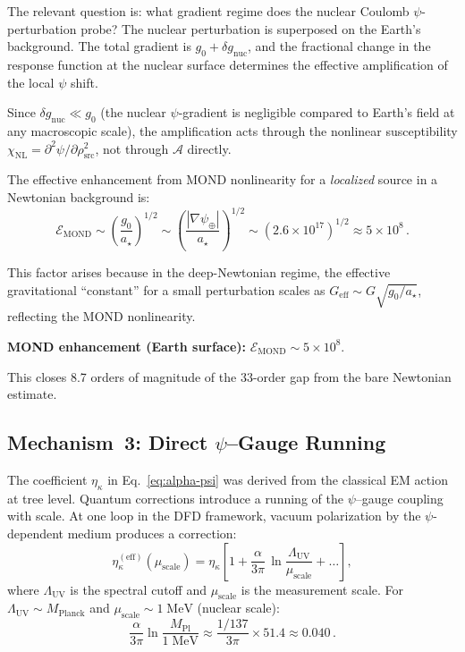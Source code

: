 \documentclass[aps,prd,twocolumn,superscriptaddress,nofootinbib]{revtex4-2}
\newcommand{\astar}{a_\star}
\newcommand{\ee}[1]{\times 10^{#1}}
\newcommand{\kap}{\kappa}
\begin{document}
The relevant question is: what gradient regime does the nuclear
Coulomb $\psi$-perturbation probe?  The nuclear perturbation is
superposed on the Earth's background.  The total gradient is
$g_0 + \delta g_{\mathrm{nuc}}$, and the fractional change in the
response function at the nuclear surface determines the effective
amplification of the local $\psi$ shift.

Since $\delta g_{\mathrm{nuc}} \ll g_0$ (the nuclear $\psi$-gradient
is negligible compared to Earth's field at any macroscopic scale),
the amplification acts through the nonlinear susceptibility
$\chi_{\mathrm{NL}} = \partial^2\psi/\partial\rho_{\mathrm{src}}^2$,
not through $\mathcal{A}$ directly.

The effective enhancement from MOND nonlinearity for a
\emph{localized} source in a Newtonian background is:
\begin{equation}\label{eq:mond-enhance}
\mathcal{E}_{\mathrm{MOND}} \sim
\left(\frac{g_0}{\astar}\right)^{1/2}
\sim \left(\frac{|\nabla\psi_\oplus|}{\astar}\right)^{1/2}
\sim (2.6\ee{17})^{1/2} \approx 5\ee{8}\,.
\end{equation}

This factor arises because in the deep-Newtonian regime, the
effective gravitational ``constant'' for a small perturbation
scales as $G_{\mathrm{eff}} \sim G\sqrt{g_0/\astar}$, reflecting
the MOND nonlinearity.

\begin{tcolorbox}[colback=blue!5!white, colframe=blue!50!black]
\textbf{MOND enhancement (Earth surface):}
$\mathcal{E}_{\mathrm{MOND}} \sim 5\ee{8}$.

This closes 8.7 orders of magnitude of the 33-order gap from
the bare Newtonian estimate.
\end{tcolorbox}

\subsection{Mechanism~3: Direct $\psi$--Gauge Running}
\label{sec:running}

The coefficient $\eta_\kap$ in Eq.~\eqref{eq:alpha-psi} was derived
from the classical EM action at tree level.  Quantum corrections
introduce a running of the $\psi$--gauge coupling with scale.
At one loop in the DFD framework, vacuum polarization by the
$\psi$-dependent medium produces a correction:
\begin{equation}\label{eq:running}
\eta_\kap^{(\mathrm{eff})}(\mu_{\mathrm{scale}}) =
\eta_\kap\left[1 + \frac{\alpha}{3\pi}\,
\ln\frac{\Lambda_{\mathrm{UV}}}{\mu_{\mathrm{scale}}}
+ \ldots\right],
\end{equation}
where $\Lambda_{\mathrm{UV}}$ is the spectral cutoff and
$\mu_{\mathrm{scale}}$ is the measurement scale.  For
$\Lambda_{\mathrm{UV}} \sim M_{\mathrm{Planck}}$ and
$\mu_{\mathrm{scale}} \sim 1\;\mathrm{MeV}$ (nuclear scale):
\begin{equation}
\frac{\alpha}{3\pi}\ln\frac{M_{\mathrm{Pl}}}{1\;\mathrm{MeV}}
\approx \frac{1/137}{3\pi}\times 51.4 \approx 0.040\,.
\end{equation}
\end{document}
